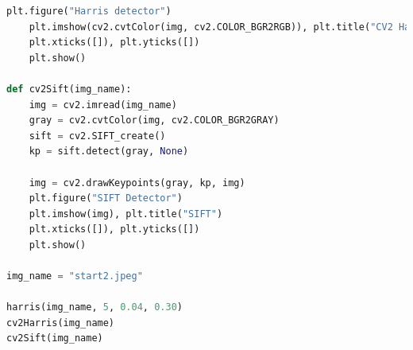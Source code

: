 \documentclass{article}
\begin{document}
\begin{appendices}
\begin{lstlisting}[language=Python]
    plt.figure("Harris detector")
    plt.imshow(cv2.cvtColor(img, cv2.COLOR_BGR2RGB)), plt.title("CV2 Harris")
    plt.xticks([]), plt.yticks([])
    plt.show()

def cv2Sift(img_name):
    img = cv2.imread(img_name)
    gray = cv2.cvtColor(img, cv2.COLOR_BGR2GRAY)
    sift = cv2.SIFT_create()
    kp = sift.detect(gray, None)

    img = cv2.drawKeypoints(gray, kp, img)
    plt.figure("SIFT Detector")
    plt.imshow(img), plt.title("SIFT")
    plt.xticks([]), plt.yticks([])
    plt.show()

img_name = "start2.jpeg"

harris(img_name, 5, 0.04, 0.30)
cv2Harris(img_name)
cv2Sift(img_name)

        \end{lstlisting}

    \end{appendices}
\end{document}
